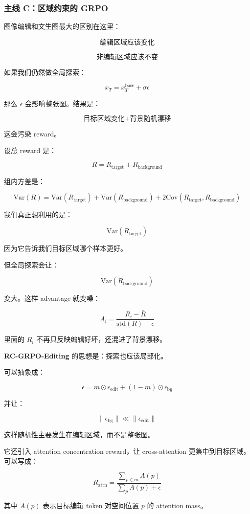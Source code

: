 \subsubsection{主线 C：区域约束的 GRPO}

图像编辑和文生图最大的区别在这里：

\[
\text{编辑区域应该变化}
\]

\[
\text{非编辑区域应该不变}
\]

如果我们仍然做全局探索：

\[
x_T
=
x_T^\text{base}
+
\sigma\epsilon
\]

那么 $\epsilon$ 会影响整张图。结果是：

\[
\text{目标区域变化}
+
\text{背景随机漂移}
\]

这会污染 reward。

设总 reward 是：

\[
R
=
R_\text{target}
+
R_\text{background}
\]

组内方差是：

\[
\text{Var}(R)
=
\text{Var}(R_\text{target})
+
\text{Var}(R_\text{background})
+
2\text{Cov}(R_\text{target},R_\text{background})
\]

我们真正想利用的是：

\[
\text{Var}(R_\text{target})
\]

因为它告诉我们目标区域哪个样本更好。

但全局探索会让：

\[
\text{Var}(R_\text{background})
\]

变大。这样 advantage 就变噪：

\[
A_i
=
\frac{R_i-\bar{R}}{\text{std}(R)+\epsilon}
\]

里面的 $R_i$ 不再只反映编辑好坏，还混进了背景漂移。

\textbf{RC-GRPO-Editing} 的思想是：探索也应该局部化。

可以抽象成：

\[
\epsilon
=
m\odot\epsilon_\text{edit}
+
(1-m)\odot\epsilon_\text{bg}
\]

并让：

\[
\|\epsilon_\text{bg}\|
\ll
\|\epsilon_\text{edit}\|
\]

这样随机性主要发生在编辑区域，而不是整张图。

它还引入 attention concentration reward，让 cross-attention 更集中到目标区域。可以写成：

\[
R_\text{attn}
=
\frac{
\sum_{p\in m}A(p)
}{
\sum_{p}A(p)+\epsilon
}
\]

其中 $A(p)$ 表示目标编辑 token 对空间位置 $p$ 的 attention mass。

